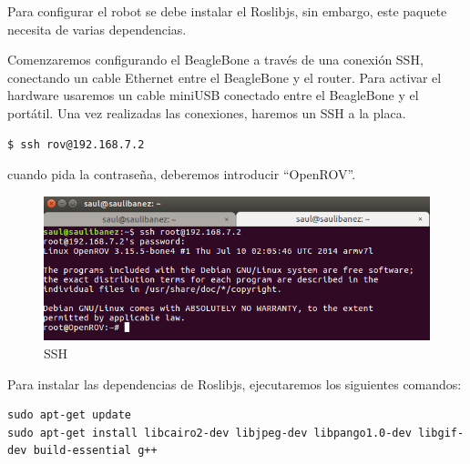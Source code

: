Para configurar el robot se debe instalar el Roslibjs, sin embargo, este paquete necesita de varias dependencias.

Comenzaremos configurando el BeagleBone a través de una conexión SSH, conectando un cable Ethernet entre el BeagleBone y el router.
Para activar el hardware usaremos un cable miniUSB conectado entre el BeagleBone y el portátil.
Una vez realizadas las conexiones, haremos un SSH a la placa.
\renewcommand{\lstlistingname}{}
\begin{lstlisting}[caption=SSH, label={lst:ssh}]
$ ssh rov@192.168.7.2
\end{lstlisting}
cuando pida la contraseña, deberemos introducir “OpenROV”.

\begin{figure} [hbtp]
  \begin{center}
    \includegraphics[width=12cm]{img/cap4/ssh}
  \end{center}
  \caption{SSH}
  \label{fig:ssh}
\end{figure}

Para instalar las dependencias de Roslibjs, ejecutaremos los siguientes comandos:

\renewcommand{\lstlistingname}{}
\begin{lstlisting}[caption=Dependencias Roslibjs, label={lst:roslibjs}]
sudo apt-get update 
sudo apt-get install libcairo2-dev libjpeg-dev libpango1.0-dev libgif-dev build-essential g++
\end{lstlisting}

